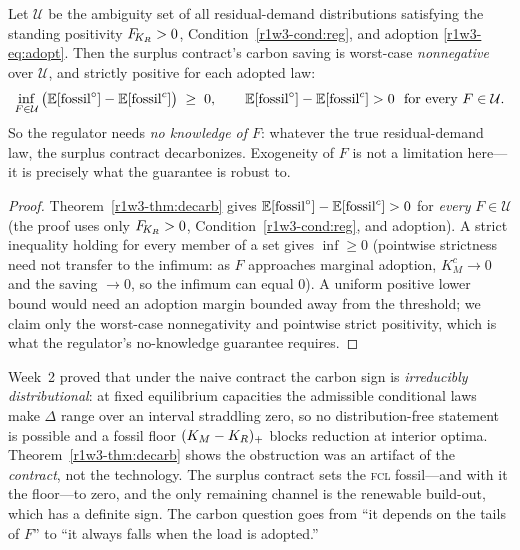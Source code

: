 \begin{corollary}\label{r1w3-cor:dro}
Let $\mathcal U$ be the ambiguity set of all residual-demand distributions satisfying the
standing positivity $F_{\!K_R}>0$, Condition~\ref{r1w3-cond:reg}, and adoption \eqref{r1w3-eq:adopt}.
Then the surplus contract's carbon saving is worst-case \emph{nonnegative} over $\mathcal U$,
and strictly positive for each adopted law:
\[
  \inf_{F\in\mathcal U}\big(\mathbb{E}[\mathrm{fossil}^{\circ}]-\mathbb{E}[\mathrm{fossil}^{c}]\big)\;\ge\;0,
  \qquad \mathbb{E}[\mathrm{fossil}^{\circ}]-\mathbb{E}[\mathrm{fossil}^{c}]>0\ \text{ for every } F\in\mathcal U.
\]
So the regulator needs \emph{no knowledge of $F$}: whatever the true residual-demand law,
the surplus contract decarbonizes. Exogeneity of $F$ is not a limitation here---it is
precisely what the guarantee is robust to.
\end{corollary}
\begin{proof}
Theorem~\ref{r1w3-thm:decarb} gives $\mathbb{E}[\mathrm{fossil}^{\circ}]-\mathbb{E}[\mathrm{fossil}^{c}]>0$ for \emph{every}
$F\in\mathcal U$ (the proof uses only $F_{\!K_R}>0$, Condition~\ref{r1w3-cond:reg}, and adoption).
A strict inequality holding for every member of a set gives $\inf\ge0$ (pointwise strictness
need not transfer to the infimum: as $F$ approaches marginal adoption, $K_M^{c}\to0$ and the
saving $\to0$, so the infimum can equal $0$). A uniform positive lower bound would need an
adoption margin bounded away from the threshold; we claim only the worst-case nonnegativity
and pointwise strict positivity, which is what the regulator's no-knowledge guarantee
requires.
\end{proof}

\begin{remark}\label{r1w3-rem:resolve}
Week~2 proved that under the naive contract the carbon sign is \emph{irreducibly
distributional}: at fixed equilibrium capacities the admissible conditional laws make
$\Delta$ range over an interval straddling zero, so no distribution-free statement is
possible and a fossil floor $(K_M-K_R)_+$ blocks reduction at interior optima.
Theorem~\ref{r1w3-thm:decarb} shows the obstruction was an artifact of the \emph{contract},
not the technology. The surplus contract sets the \textsc{fcl} fossil---and with it the
floor---to zero, and the only remaining channel is the renewable build-out, which has a
definite sign. The carbon question goes from ``it depends on the tails of $F$'' to
``it always falls when the load is adopted.''
\end{remark}

